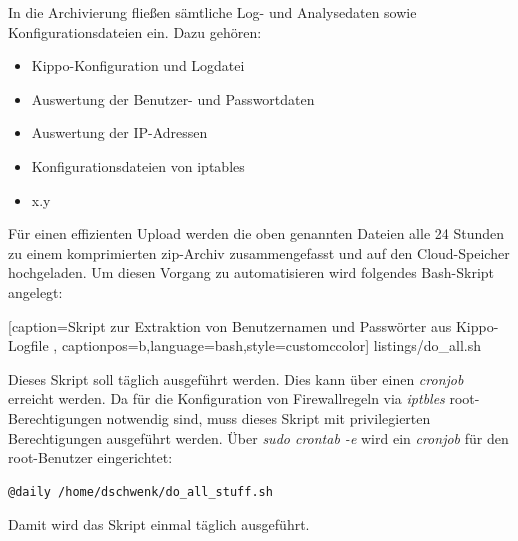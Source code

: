 In die Archivierung fließen sämtliche Log- und Analysedaten sowie Konfigurationsdateien ein. Dazu gehören:

\begin{itemize}
\item Kippo-Konfiguration und Logdatei
\item Auswertung der Benutzer- und Passwortdaten
\item Auswertung der IP-Adressen
\item Konfigurationsdateien von iptables
\item x.y
\end{itemize}

Für einen effizienten Upload werden die oben genannten Dateien alle 24 Stunden zu einem komprimierten zip-Archiv zusammengefasst und auf den Cloud-Speicher hochgeladen. Um diesen Vorgang zu automatisieren wird folgendes Bash-Skript angelegt:


    [caption={Skript zur Extraktion von Benutzernamen und Passwörter aus Kippo-Logfile}
       \label{lst:mitm_onmsg},
       captionpos=b,language=bash,style=customccolor]
 {listings/do_all.sh}
 
Dieses Skript soll täglich ausgeführt werden. Dies kann über einen \textit{cronjob} erreicht werden. Da für die Konfiguration von Firewallregeln via \textit{iptbles} root-Berechtigungen notwendig sind, muss dieses Skript mit privilegierten Berechtigungen ausgeführt werden. Über \textit{sudo crontab -e} wird ein \textit{cronjob} für den root-Benutzer eingerichtet:

\begin{lstlisting}[style=customc]
@daily /home/dschwenk/do_all_stuff.sh
\end{lstlisting}

Damit wird das Skript einmal täglich ausgeführt.